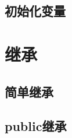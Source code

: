 \documentclass{../main.tex}{subfiles}
\begin{document}
\subsection{初始化变量}


\section{继承}
\subsection{简单继承}


\subsection{public继承}





\end{document}
